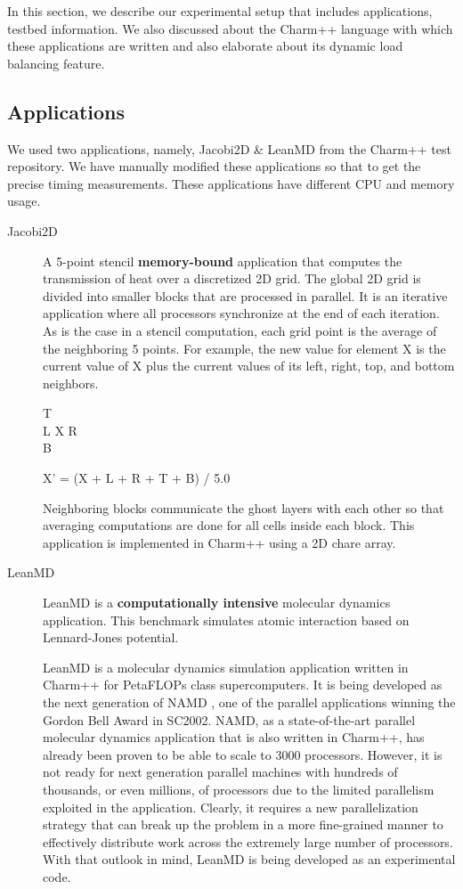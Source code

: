 In this section, we describe our experimental setup that includes
applications, testbed information. We also discussed about the Charm++
language with which these applications are written and also elaborate about
its dynamic load balancing feature.

\subsection{Applications}
We used two applications, namely, Jacobi2D \& LeanMD\cite{leanmd} from the
Charm++ test repository.  We have manually modified these applications so that
to get the precise timing measurements.  These applications have different CPU
and memory usage.
\begin{description}
\item[Jacobi2D] \hspace{1mm}

A 5-point stencil \textbf{memory-bound} application that computes the transmission of heat over a
discretized 2D grid. The global 2D grid is divided into smaller blocks that are
processed in parallel. It is an iterative application where all processors
synchronize at the end of each iteration. As is the case in a stencil
computation, each grid point is the average of the neighboring 5 points.
For example, the new value for element X is the current
value of X plus the current values of its left, right, top, and
bottom neighbors. 
\begin{center}       
          T    \\
        L X R  \\
          B    \\
\end{center}       
X'  = (X + L + R + T + B) / 5.0

Neighboring blocks communicate the ghost layers with each other so that
averaging computations are done for all cells inside each block. This
application is implemented in Charm++ using a 2D chare array.

\item [LeanMD] \hspace{1mm}

LeanMD \cite{leanmd} is a \textbf{computationally intensive} molecular dynamics application.
This benchmark simulates atomic interaction based on Lennard-Jones potential.


LeanMD is a molecular dynamics simulation application written in Charm++ for
PetaFLOPs class supercomputers. It is being developed as the next generation of
NAMD \cite{namd}, one of the parallel
applications winning the Gordon Bell Award in SC2002. NAMD, as a
state-of-the-art parallel molecular dynamics application that is also written
in Charm++, has already been proven to be able to scale to 3000 processors.
However, it is not ready for next generation parallel machines with hundreds of
thousands, or even millions, of processors due to the limited parallelism
exploited in the application.  Clearly, it requires a new parallelization
strategy that can break up the problem in a more fine-grained manner to
effectively distribute work across the extremely large number of processors.
With that outlook in mind, LeanMD is being developed as an experimental code.


\end{description}
